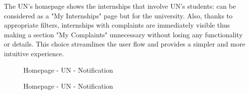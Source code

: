\par The UN's homepage shows the internships that involve UN's students: can be considered as a "My Internships" page
but for the university. Also, thanks to appropriate filters, internships with complaints are immediately visible thus
making a section "My Complaints" unnecessary without losing any functionality or details. This choice streamlines the
user flow and provides a simpler and more intuitive experience.

\begin{figure}[H]
    \centering
    \caption{Homepage - UN - Notification}
    \label{fig:homepage-un-notification}
\end{figure}

\begin{figure}[H]
    \centering
    \caption{Homepage - UN - Notification}
    \label{fig:homepage-un-notification}
\end{figure}

